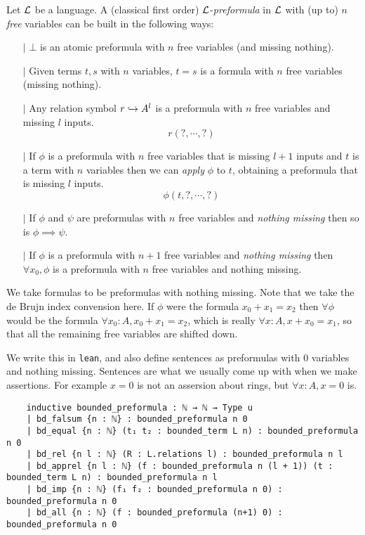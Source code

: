 \begin{dfn}[Formulas]
  Let $\mathcal{L}$ be a language.
  A (classical first order) $\mathcal{L}$-\textit{preformula} in $\mathcal{L}$
  with (up to) $n$ \textit{free} variables can be built in the following ways:
  \begin{itemize}
    \item[$\vert$] $\bot$ is an atomic preformula with $n$ free variables
          (and missing nothing).
    \item[$\vert$]
          Given terms $t, s$ with $n$ variables,
          $t = s$ is a formula with $n$ free variables (missing nothing).
    \item[$\vert$] Any relation symbol $r \hookrightarrow A^{l}$ is a preformula
          with $n$ free variables and missing $l$ inputs.
          \[ r (?, \cdots, ?)\]
    \item[$\vert$] If $\phi$ is a preformula with $n$ free variables that is missing
          $l + 1$ inputs and $t$ is a term with $n$ variables
          then we can \textit{apply} $\phi$ to $t$, obtaining
          a preformula that is missing $l$ inputs.
          \[ \phi(t , ? , \cdots, ? )\]
    \item[$\vert$] If $\phi$ and $\psi$ are preformulas with $n$ free variables
          and \textit{nothing missing} then so is $\phi \implies \psi$.
    \item[$\vert$] If $\phi$ is a preformula with $n + 1$ free variables
          and \textit{nothing missing} then $\forall x_{0}, \phi$ is a preformula
          with $n$ free variables and nothing missing.
  \end{itemize}

  We take formulas to be preformulas with nothing missing.
  Note that we take the de Brujn index convension here.
  If $\phi$ were the formula $x_{0} + x_{1} = x_{2}$ then $\forall \phi$ would be
  the formula $\forall x_{0} : A, x_{0} + x_{1} = x_{2}$,
  which is really $\forall x : A, x + x_{0} = x_{1}$,
  so that all the remaining free variables are shifted down.

  We write this in \texttt{lean},
  and also define sentences as preformulas with $0$ variables and nothing missing.
  Sentences are what we usually come up with when we make assertions.
  For example $x = 0$ is not an assersion about rings,
  but $\forall x : A, x = 0$ is.

  \begin{lstlisting}
    inductive bounded_preformula : ℕ → ℕ → Type u
    | bd_falsum {n : ℕ} : bounded_preformula n 0
    | bd_equal {n : ℕ} (t₁ t₂ : bounded_term L n) : bounded_preformula n 0
    | bd_rel {n l : ℕ} (R : L.relations l) : bounded_preformula n l
    | bd_apprel {n l : ℕ} (f : bounded_preformula n (l + 1)) (t : bounded_term L n) : bounded_preformula n l
    | bd_imp {n : ℕ} (f₁ f₂ : bounded_preformula n 0) : bounded_preformula n 0
    | bd_all {n : ℕ} (f : bounded_preformula (n+1) 0) : bounded_preformula n 0


\end{lstlisting}
\end{dfn}
